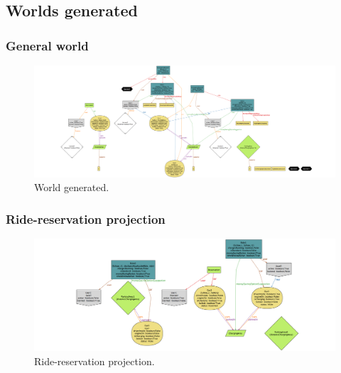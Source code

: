 	\begin{landscape}
	
	\subsection{Worlds generated}
	
		\subsubsection{General world}
			\begin{figure}				
				\includegraphics[width=2\textwidth, center]{img/world1.png}
				\caption{World generated.}
				\label{figure 1}
			\end{figure}
	
		\subsubsection{Ride-reservation projection}
			\begin{figure}						
				\includegraphics[width=2\textwidth, center]{img/rides_reservations.png}
				\caption{Ride-reservation projection.}
				\label{figure 2}
			\end{figure}

	

\end{landscape}
